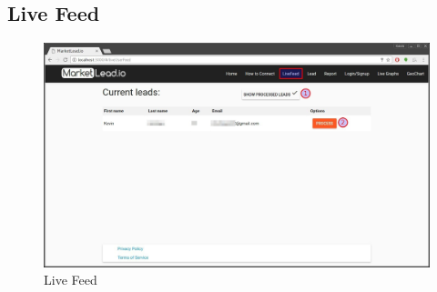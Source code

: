 \documentclass{article}
\begin{document}
		\subsection{Live Feed}
			\begin{figure}[H]
				\includegraphics[width=\textwidth]{images/live_feed.jpg}
				\caption{Live Feed}
				\label{fig:liveFeed}
			\end{figure}
\end{document}
